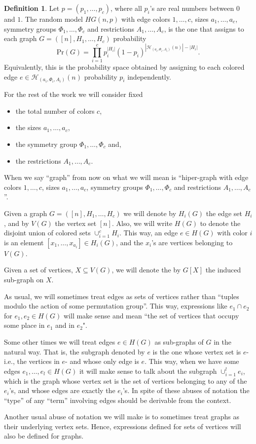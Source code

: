\documentclass[11pt,notitlepage,a4paper]{article}
\theoremstyle{definition}
\newtheorem{definition}{Definition}[section]
\begin{document}
\begin{definition} 
	Let $p=(p_1,\dots, p_c)$, where all $p_i$'s are real numbers
	between $0$ and $1$. 
	The random model $HG(n,p)$ with edge colors $1,\dots,c$,
	sizes $a_1,\dots,a_c$, 
	symmetry groups $\Phi_1,\dots,\Phi_c$ 
	and restrictions $A_1,\dots,A_c$, is the one that
	assigns to each graph $G=([n], H_1,\dots, H_c)$
	probability
	\[ \mathrm{Pr}(G)=\prod_{i=1}^{c} p_i^{|H_i|}(1-p_i)^{|\mathcal{H}_{(a_i,\Phi_i,A_i)}(n)|-|H_i|}.	
	\]
	Equivalently, this is the probability space obtained by 
	assigning to each colored edge 
	$e\in \mathcal{H}_{(a_i,\Phi_i,A_i)}(n)$ probability $p_i$ independently. 
\end{definition}

For the rest of the work we will consider  fixed
\begin{itemize}
	\item the total number of colors $c$,	
	\item the sizes $a_1,\dots,a_c$,
	\item the symmetry group $\Phi_1,\dots, \Phi_c$ and,
	\item the restrictions $A_1,\dots,A_c$.
\end{itemize}
When we say ``graph'' from now on what
we will mean is ``hiper-graph with edge colors 
$1,\dots, c$, sizes $a_1,\dots,a_c$, 
symmetry groups $\Phi_1,\dots,\Phi_c$ and 
restrictions $A_1,\dots,A_c$''. \par

Given a graph $G=([n], H_1,\dots, H_c)$ we will denote by
$H_i(G)$ the edge set $H_i$, and by $V(G)$ the vertex set
$[n]$. Also, we will write $H(G)$ to denote the 
disjoint union of colored sets $\cup_{i=1}^c H_i$.
This way, an edge $e\in H(G)$ with color $i$ is an element
$[x_1,\dots,x_{a_i}]\in H_i(G)$, and the $x_i$'s are vertices
belonging to $V(G)$. \par
Given a set of vertices, $X\subseteq V(G)$, we will denote
the by $G[X]$ the induced sub-graph on $X$. \par
As usual, we will sometimes treat edges as sets of vertices
rather than ``tuples modulo the action of some permutation group''. 
This way, expressions like $e_1\cap e_2$ for $e_1, e_2\in H(G)$
will make sense and mean 
``the set of vertices that occupy some place in $e_1$ 
and in $e_2$".\par
Some other times we will treat edges $e\in H(G)$
as sub-graphs of $G$ in the natural way. That is, the subgraph
denoted by $e$ is the one whose vertex set is $e$-i.e., the vertices in $e$-
and whose only edge is $e$. 
This way, when we have some edges $e_1,\dots, e_l\in H(G)$ 
it will make sense to talk
about the subgraph $\cup_{i=1}^l e_i$, which is the graph
whose vertex set is the set of vertices belonging to any of the $e_i$'s, 
and whose edges are exactly the $e_i$'s. In spite of these
abuses of notation the ``type'' of any ``term'' involving edges 
should be derivable from the context. \par
Another usual abuse of notation we will make is to sometimes
treat graphs as their underlying vertex sets. Hence,
expressions defined for sets of vertices will also be defined 
for graphs. 
\end{document}
